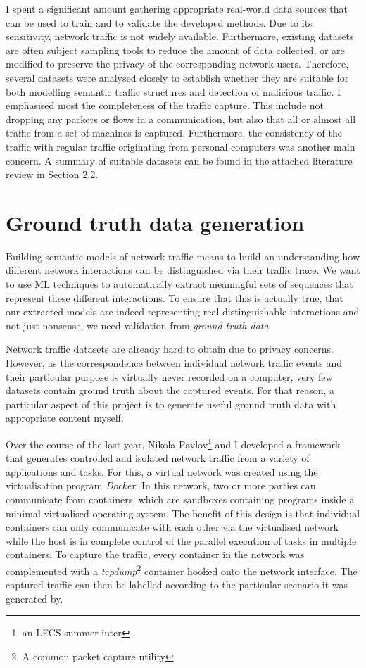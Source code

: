 \documentclass[a4paper,12pt,twoside]{report}
\begin{document}
I spent a significant amount gathering appropriate  real-world data sources that can be used to train and to validate the developed methods. Due to its sensitivity, network traffic is not widely available. Furthermore, existing datasets are often subject sampling tools to reduce the amount of data collected, or are modified to preserve the privacy of the corresponding network users. Therefore, several datasets were analysed closely to establish whether they are suitable for both modelling semantic traffic structures and detection of malicious traffic. I emphasised most the completeness of the traffic capture. This include not dropping any packets or flows in a communication, but also that all or almost all traffic from a set of machines is captured. Furthermore, the consistency of the traffic with regular traffic originating from personal computers was another main concern. A summary of suitable datasets can be found in the attached literature review in Section 2.2. 



\section{Ground truth data generation}\label{Groundtruth}

Building semantic models of network traffic means to build an understanding how different network interactions can be distinguished via their traffic trace. We want to use ML techniques to automatically extract meaningful sets of sequences that represent these different interactions. To ensure that this is actually true, that our extracted models are indeed representing real distinguishable interactions and not just nonsense, we need validation from \textit{ground truth data}. 

Network traffic datasets are already hard to obtain due to privacy concerns. However, as  the correspondence between individual network traffic events and their particular purpose is virtually never recorded on a computer, very few datasets contain ground truth about the captured events. For that reason, a particular aspect of this project is to generate useful ground truth data with appropriate content myself.

Over the course of the last year, Nikola Pavlov\footnote{an LFCS summer inter} and I developed a framework that generates controlled and isolated network traffic from a variety of applications and tasks. For this, a virtual network was created using the virtualisation program \textit{Docker}. In this network, two or more parties can communicate from containers,  which are sandboxes containing programs inside a minimal virtualised operating system. The benefit of this design is that individual containers can only communicate with each other via the virtualised network while the host is in complete control of the parallel execution of tasks in multiple containers. To capture the traffic, every container in the network was complemented with a \textit{tcpdump}\footnote{A common packet capture utility} container hooked onto the network interface. The captured traffic can then be labelled according to the particular scenario it was generated by.
\end{document}
